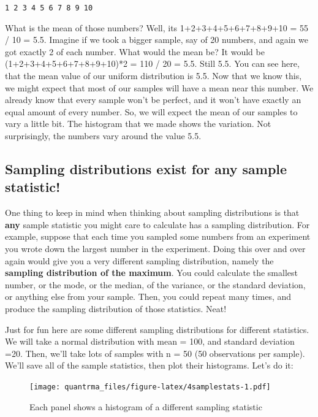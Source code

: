 \documentclass[
]{book}
\begin{document}
\texttt{1\ 2\ 3\ 4\ 5\ 6\ 7\ 8\ 9\ 10}

What is the mean of those numbers? Well, its 1+2+3+4+5+6+7+8+9+10 = 55 / 10 = 5.5. Imagine if we took a bigger sample, say of 20 numbers, and again we got exactly 2 of each number. What would the mean be? It would be (1+2+3+4+5+6+7+8+9+10)*2 = 110 / 20 = 5.5. Still 5.5. You can see here, that the mean value of our uniform distribution is 5.5. Now that we know this, we might expect that most of our samples will have a mean near this number. We already know that every sample won't be perfect, and it won't have exactly an equal amount of every number. So, we will expect the mean of our samples to vary a little bit. The histogram that we made shows the variation. Not surprisingly, the numbers vary around the value 5.5.

\hypertarget{sampling-distributions-exist-for-any-sample-statistic}{%
\subsection{Sampling distributions exist for any sample statistic!}\label{sampling-distributions-exist-for-any-sample-statistic}}

One thing to keep in mind when thinking about sampling distributions is that \textbf{any} sample statistic you might care to calculate has a sampling distribution. For example, suppose that each time you sampled some numbers from an experiment you wrote down the largest number in the experiment. Doing this over and over again would give you a very different sampling distribution, namely the \textbf{sampling distribution of the maximum}. You could calculate the smallest number, or the mode, or the median, of the variance, or the standard deviation, or anything else from your sample. Then, you could repeat many times, and produce the sampling distribution of those statistics. Neat!

Just for fun here are some different sampling distributions for different statistics. We will take a normal distribution with mean = 100, and standard deviation =20. Then, we'll take lots of samples with n = 50 (50 observations per sample). We'll save all of the sample statistics, then plot their histograms. Let's do it:

\begin{figure}
\centering
\texttt{[image: quantrma\_files/figure-latex/4samplestats-1.pdf]}
\caption{\label{fig:4samplestats}Each panel shows a histogram of a different sampling statistic}
\end{figure}
\end{document}
